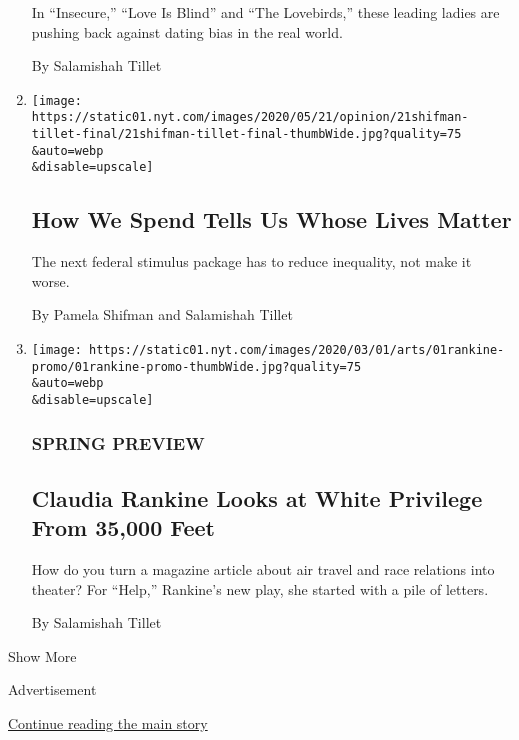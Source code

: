 \begin{enumerate}
  In ``Insecure,'' ``Love Is Blind'' and ``The Lovebirds,'' these
  leading ladies are pushing back against dating bias in the real world.

  By Salamishah Tillet
\item
  \href{/2020/05/21/opinion/coronavirus-stimulus-women.html}{}

  \texttt{[image: https://static01.nyt.com/images/2020/05/21/opinion/21shifman-tillet-final/21shifman-tillet-final-thumbWide.jpg?quality=75\\\&auto=webp\\\&disable=upscale]}

  \hypertarget{how-we-spend-tells-us-whose-lives-matter}{%
  \subsection{How We Spend Tells Us Whose Lives
  Matter}\label{how-we-spend-tells-us-whose-lives-matter}}

  The next federal stimulus package has to reduce inequality, not make
  it worse.

  By Pamela Shifman and Salamishah Tillet
\item
  \href{/2020/02/26/theater/claudia-rankine-help.html}{}

  \texttt{[image: https://static01.nyt.com/images/2020/03/01/arts/01rankine-promo/01rankine-promo-thumbWide.jpg?quality=75\\\&auto=webp\\\&disable=upscale]}

  \hypertarget{spring-preview}{%
  \subsubsection{SPRING PREVIEW}\label{spring-preview}}

  \hypertarget{claudia-rankine-looks-at-white-privilege-from-35000-feet}{%
  \subsection{Claudia Rankine Looks at White Privilege From 35,000
  Feet}\label{claudia-rankine-looks-at-white-privilege-from-35000-feet}}

  How do you turn a magazine article about air travel and race relations
  into theater? For ``Help,'' Rankine's new play, she started with a
  pile of letters.

  By Salamishah Tillet
\end{enumerate}

Show More

Advertisement

\protect\hyperlink{after-mid2}{Continue reading the main story}

